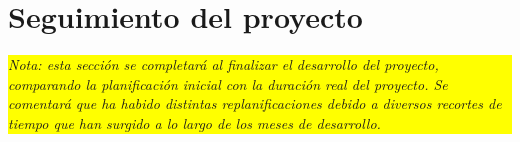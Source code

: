 \section{Seguimiento del proyecto}\label{cap:planificacionFinal}

\colorbox{yellow}{\parbox{\dimexpr\linewidth-2\fboxsep}{\textit{Nota: esta sección se completará al finalizar el desarrollo del proyecto, comparando la planificación inicial con la duración real del proyecto. Se comentará que ha habido distintas replanificaciones debido a diversos recortes de tiempo que han surgido a lo largo de los meses de desarrollo.}}}

